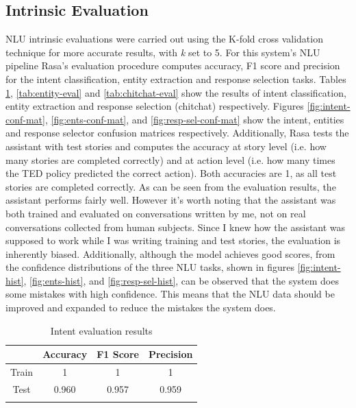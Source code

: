 \documentclass[journal, 11pt]{IEEEtran}
\begin{document}
\subsection{Intrinsic Evaluation}
NLU intrinsic evaluations were carried out using the K-fold cross validation technique for more accurate results, with \textit{k} set to 5.
For this system's NLU pipeline Rasa's evaluation procedure \cite{rasatest} computes accuracy, F1 score and precision for the intent classification, entity extraction and response selection tasks.
Tables \ref{tab:intent-eval}, \ref{tab:entity-eval} and \ref{tab:chitchat-eval} show the results of intent classification, entity extraction and response selection (chitchat) respectively.
Figures \ref{fig:intent-conf-mat}, \ref{fig:ents-conf-mat}, and \ref{fig:resp-sel-conf-mat} show the intent, entities and response selector confusion matrices respectively.
Additionally, Rasa tests the assistant with test stories and computes the accuracy at story level (i.e. how many stories are completed correctly) and at action level (i.e. how many times the TED policy predicted the correct action).
Both accuracies are 1, as all test stories are completed correctly.
As can be seen from the evaluation results, the assistant performs fairly well. However it's worth noting that the assistant was both trained and evaluated on conversations written by me, not on real conversations collected from human subjects.
Since I knew how the assistant was supposed to work while I was writing training and test stories, the evaluation is inherently biased.
Additionally, although the model achieves good scores, from the confidence distributions of the three NLU tasks, shown in figures \ref{fig:intent-hist}, \ref{fig:ents-hist}, and \ref{fig:resp-sel-hist}, can be observed that the system does some mistakes with high confidence. This means that the NLU data should be improved and expanded to reduce the mistakes the system does.

\begin{table}[ht]
    \centering
    \begin{tabular}{@{}cccc@{}}
        \toprule
        \textbf{} & \textbf{Accuracy} & \textbf{F1 Score} & \textbf{Precision} \\ \midrule
        Train     & 1                 & 1                 & 1                  \\
        Test      & 0.960             & 0.957             & 0.959              \\ \bottomrule\\
    \end{tabular}
    \caption{Intent evaluation results}
    \label{tab:intent-eval}
\end{table}
\end{document}
